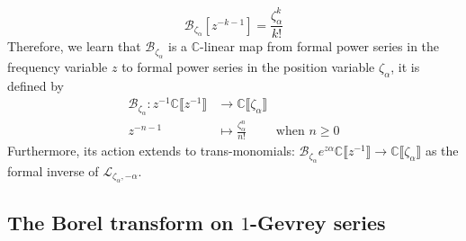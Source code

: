 \documentclass{article}
\theoremstyle{definition}
\newcommand{\maps}{\colon}
\newcommand{\C}{\mathbb{C}}
\newcommand{\laplace}{\mathcal{L}}
\newcommand{\borel}{\mathcal{B}}
\theoremstyle{plain}
\begin{document}
       \[\borel_{\zeta_\alpha}\left[z^{-k-1}\right]=\frac{\zeta_\alpha^k}{k!}\]
 Therefore, we learn that $\borel_{\zeta_\alpha}$ is a $\C$-linear map from formal power series in the frequency variable $z$ to formal power series in the position variable $\zeta_\alpha$, it is defined by 
 \begin{align*}
     \borel_{\zeta_\alpha}\colon z^{-1}\C\llbracket z^{-1}\rrbracket &\to \C\llbracket \zeta_\alpha \rrbracket  \\
     z^{-n-1}& \mapsto \frac{\zeta_\alpha^n}{n!} \qquad \text{ when } n\geq 0
 \end{align*}
 Furthermore, its action extends to trans-monomials: $\borel_{\zeta_\alpha}e^{z\alpha}\C\llbracket z^{-1}\rrbracket\to \C\llbracket \zeta_\alpha \rrbracket$ as the formal inverse of $\laplace_{\zeta_\alpha,-\alpha}$. 

  

\subsection{The Borel transform on $1$-Gevrey series}\label{sec:formal_borel}

\end{document}
